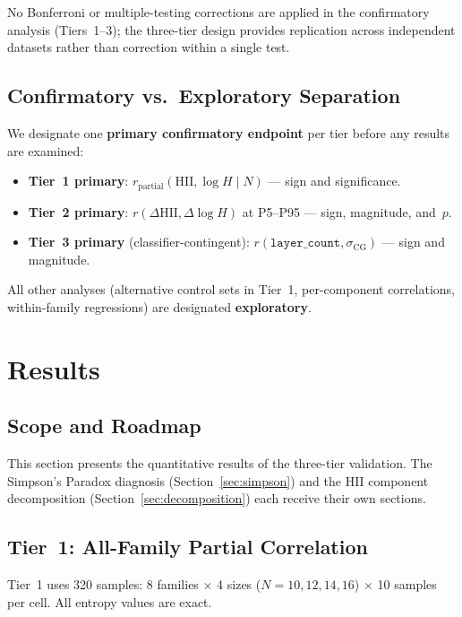 \documentclass[entropy,article,submit,pdftex,moreauthors]{Definitions/mdpi}
\begin{document}
No Bonferroni or multiple-testing corrections are applied in the confirmatory analysis (Tiers~1--3); the three-tier design provides replication across independent datasets rather than correction within a single test.

\subsection{Confirmatory vs.\ Exploratory Separation}

We designate one \textbf{primary confirmatory endpoint} per tier before any results are examined:

\begin{itemize}[nosep]
    \item \textbf{Tier~1 primary}: $r_\text{partial}(\text{HII}, \log H \mid N)$ --- sign and significance.
    \item \textbf{Tier~2 primary}: $r(\Delta\text{HII}, \Delta\log H)$ at P5--P95 --- sign, magnitude, and~$p$.
    \item \textbf{Tier~3 primary} (classifier-contingent): $r(\texttt{layer\_count}, \sigma_\text{CG})$ --- sign and magnitude.
\end{itemize}

All other analyses (alternative control sets in Tier~1, per-component correlations, within-family regressions) are designated \textbf{exploratory}.

\section{Results}\label{sec:results}

\subsection{Scope and Roadmap}

This section presents the quantitative results of the three-tier validation. The Simpson's Paradox diagnosis (Section~\ref{sec:simpson}) and the HII component decomposition (Section~\ref{sec:decomposition}) each receive their own sections.

\subsection{Tier~1: All-Family Partial Correlation}

Tier~1 uses 320 samples: 8 families $\times$ 4 sizes ($N = 10, 12, 14, 16$) $\times$ 10 samples per cell. All entropy values are exact.
\end{document}
